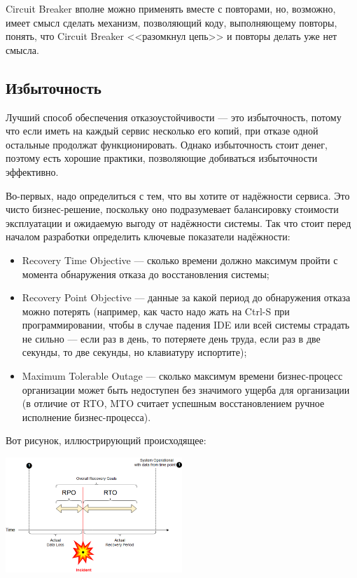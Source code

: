 \documentclass{../../text-style}
\begin{document}
Circuit Breaker вполне можно применять вместе с повторами, но, возможно, имеет смысл сделать механизм, позволяющий коду, выполняющему повторы, понять, что Circuit Breaker <<разомкнул цепь>> и повторы делать уже нет смысла.

\subsection{Избыточность}

Лучший способ обеспечения отказоустойчивости --- это избыточность, потому что если иметь на каждый сервис несколько его копий, при отказе одной остальные продолжат функционировать. Однако избыточность стоит денег, поэтому есть хорошие практики, позволяющие добиваться избыточности эффективно.

Во-первых, надо определиться с тем, что вы хотите от надёжности сервиса. Это чисто бизнес-решение, поскольку оно подразумевает балансировку стоимости эксплуатации и ожидаемую выгоду от надёжности системы. Так что стоит перед началом разработки определить ключевые показатели надёжности: 
\begin{itemize}
    \item Recovery Time Objective --- сколько времени должно максимум пройти с момента обнаружения отказа до восстановления системы;
    \item Recovery Point Objective --- данные за какой период до обнаружения отказа можно потерять (например, как часто надо жать на Ctrl-S при программировании, чтобы в случае падения IDE или всей системы страдать не сильно --- если раз в день, то потеряете день труда, если раз в две секунды, то две секунды, но клавиатуру испортите);
    \item Maximum Tolerable Outage --- сколько максимум времени бизнес-процесс организации может быть недоступен без значимого ущерба для организации (в отличие от RTO, MTO считает успешным восстановлением ручное исполнение бизнес-процесса).
\end{itemize}

Вот рисунок, иллюстрирующий происходящее:

\begin{center}
    \includegraphics[width=0.5\textwidth]{rpoRtoExample.png}
\end{center}
\end{document}
